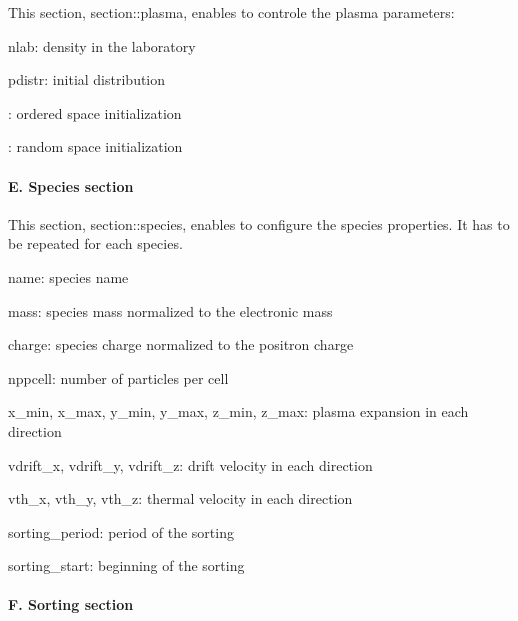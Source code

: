 This section, {\ttfamily section\+::plasma}, enables to controle the plasma parameters\+:


\begin{DoxyItemize}
\item {\ttfamily nlab}\+: density in the laboratory
\item {\ttfamily pdistr}\+: initial distribution
\begin{DoxyItemize}
\item {}\+: ordered space initialization
\item {}\+: random space initialization
\end{DoxyItemize}
\end{DoxyItemize}

\paragraph*{E. Species section}

This section, {\ttfamily section\+::species}, enables to configure the species properties. It has to be repeated for each species.


\begin{DoxyItemize}
\item {\ttfamily name}\+: species name
\item {\ttfamily mass}\+: species mass normalized to the electronic mass
\item {\ttfamily charge}\+: species charge normalized to the positron charge
\item {\ttfamily nppcell}\+: number of particles per cell
\item {\ttfamily x\+\_\+min}, {\ttfamily x\+\_\+max}, {\ttfamily y\+\_\+min}, {\ttfamily y\+\_\+max}, {\ttfamily z\+\_\+min}, {\ttfamily z\+\_\+max}\+: plasma expansion in each direction
\item {\ttfamily vdrift\+\_\+x}, {\ttfamily vdrift\+\_\+y}, {\ttfamily vdrift\+\_\+z}\+: drift velocity in each direction
\item {\ttfamily vth\+\_\+x}, {\ttfamily vth\+\_\+y}, {\ttfamily vth\+\_\+z}\+: thermal velocity in each direction
\item {\ttfamily sorting\+\_\+period}\+: period of the sorting
\item {\ttfamily sorting\+\_\+start}\+: beginning of the sorting
\end{DoxyItemize}

\paragraph*{F. Sorting section}

